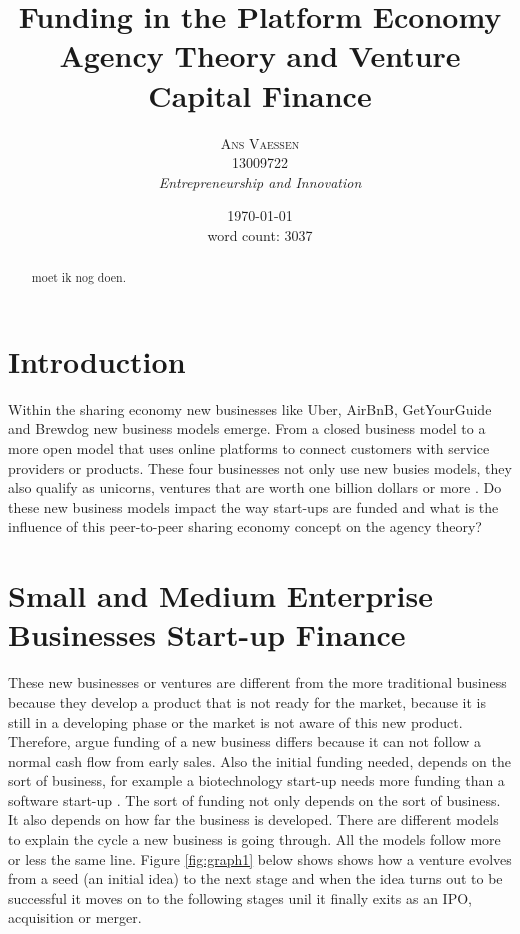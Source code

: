 \documentclass[a4paper, 11pt]{article}
\title{\textbf{Funding in the Platform Economy}\\Agency Theory and Venture Capital Finance}
\author{\textsc{Ans Vaessen}
\\13009722
\\{\textit{Entrepreneurship and Innovation}}}
\date{\today\\
word count: 3037}
\begin{document}
\maketitle

\begin{abstract}
moet ik nog doen.
\end{abstract}



\vspace{30pt} %

\section*{Introduction}


Within the sharing economy new businesses like Uber, AirBnB, GetYourGuide and Brewdog new business models emerge. From a closed business model to a more open model that uses online platforms to connect customers with service providers or products. These four businesses not only use new busies models, they also qualify as unicorns, ventures that are worth one billion dollars or more \citep{TiddBessant}. Do these new business models impact the way start-ups are funded and what is the influence of this peer-to-peer sharing economy concept on the agency theory?

\section{Small and Medium Enterprise Businesses Start-up Finance}

These new businesses or ventures are different from the more traditional business because they develop a product that is not ready for the market, because it is still in a developing phase or the market is not aware of this new product. Therefore, \cite{TiddBessant} argue funding of a new business differs because it can not follow a normal cash flow from early sales. Also the initial funding needed, depends on the sort of business, for example a biotechnology start-up needs more funding than a software start-up \citep{TiddBessant}. The sort of funding not only depends on the sort of business. It also depends on how far the business is developed. There are different models to explain the cycle a new business is going through. All the models follow more or less the same line. Figure \ref{fig:graph1} below shows shows how a venture evolves from a seed (an initial idea) to the next stage and when the idea turns out to be successful it moves on to the following stages unil it finally exits as an IPO, acquisition or merger.
\end{document}

